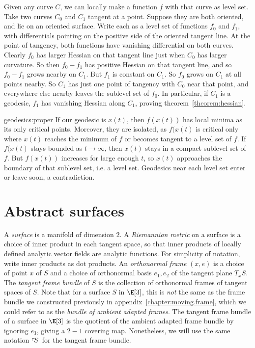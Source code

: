 Given any curve \(C\), we can locally make a function \(f\) with that curve as level set.
Take two curves \(C_0\) and \(C_1\) tangent at a point.
Suppose they are both oriented, and lie on an oriented surface.
Write each as a level set of functions \(f_0\) and \(f_1\), with differentials pointing on the positive side of the oriented tangent line.
At the point of tangency, both functions have vanishing differential on both curves.
Clearly \(f_0\) has larger Hessian on that tangent line just when \(C_0\) has larger curvature.
So then \(f_0-f_1\) has positive Hessian on that tangent line, and so \(f_0-f_1\) grows nearby on \(C_1\).
But \(f_1\) is constant on \(C_1\).
So \(f_0\) grows on \(C_1\) at all points nearby.
So \(C_1\) has just one point of tangency with \(C_0\) near that point, and everywhere else nearby leaves the sublevel set of \(f_0\).
In particular, if \(C_1\) is a geodesic, \(f_1\) has vanishing Hessian along \(C_1\), proving theorem~\vref{theorem:hessian}.
\begin{answer}{geodesics:proper}
If our geodesic is \(x(t)\), then \(f(x(t))\) has local minima as its only critical points.
Moreover, they are isolated, as \(f(x(t)\) is critical only where \(x(t)\) reaches the minimum of \(f\) or becomes tangent to a level set of \(f\).
If \(f(x(t)\) stays bounded as \(t\to\infty\), then \(x(t)\) stays in a compact sublevel set of \(f\).
But \(f(x(t))\) increases for large enough \(t\), so \(x(t)\) approaches the boundary of that sublevel set, i.e. a level set.
Geodesics near each level set enter or leave soon, a contradiction.
\end{answer}

\section{Abstract surfaces}
A \emph{surface} is a manifold of dimension \(2\).
A \emph{Riemannian metric} on a surface is a choice of inner product in each tangent space, so that inner products of locally defined analytic vector fields are analytic functions.
For simplicity of notation, write inner products as dot products.
An \emph{orthonormal frame}  \((x,e)\) is a choice of point \(x\) of \(S\) and a choice of orthonormal basis \(e_1, e_2\) of the tangent plane \(T_x S\).
The \emph{tangent frame bundle} of \(S\) is the collection of orthonormal frames of tangent spaces of \(S\).
Note that for a surface \(S\) in \(\E[3]\), this is \emph{not} the same as the frame bundle we constructed previously in appendix~\vref{chapter:moving.frame}, which we could refer to as the \emph{bundle of ambient adapted frames}.
The tangent frame bundle of a surface in \(\E[3]\) is the quotient of the ambient adapted frame bundle by ignoring \(e_3\), giving a \(2-1\) covering map.
Nonetheless, we will use the same notation \(\left\ulcorner\!S\right.\) for the tangent frame bundle.

